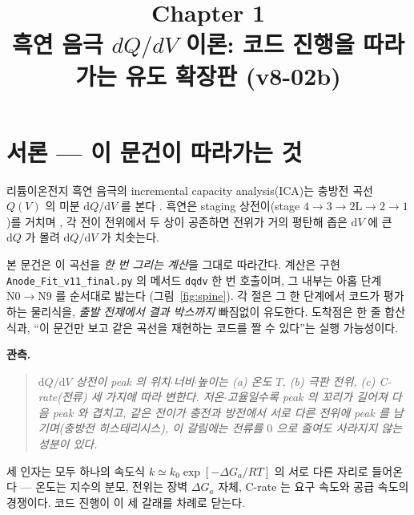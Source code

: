 \documentclass[11pt,a4paper]{article}
\title{\textbf{\LARGE Chapter 1}\\[0.35em]\Large 흑연 음극 $dQ/dV$ 이론: 코드 진행을 따라가는 유도 확장판 (v8-02b)}
\author{}
\date{}
\newcommand{\dd}{\mathrm{d}}
\newcommand{\code}[1]{\texttt{#1}}
\begin{document}
\maketitle

\section*{서론 — 이 문건이 따라가는 것}
리튬이온전지 흑연 음극의 incremental capacity analysis(ICA)는 충방전 곡선 $Q(V)$ 의 미분
$\dd Q/\dd V$ 를 본다 \cite{bloom2005,dubarry2012}. 흑연은 staging 상전이(stage
$4\!\to\!3\!\to\!2\mathrm L\!\to\!2\!\to\!1$)를 거치며 \cite{dahn1991,ohzuku1993}, 각 전이 전위에서
두 상이 공존하면 전위가 거의 평탄해 좁은 $\dd V$ 에 큰 $\dd Q$ 가 몰려 $\dd Q/\dd V$ 가 치솟는다.

본 문건은 이 곡선을 \emph{한 번 그리는 계산}을 그대로 따라간다. 계산은 구현 \code{Anode\_Fit\_v11\_final.py}
의 메서드 \code{dqdv} 한 번 호출이며, 그 내부는 아홉 단계 $\mathrm N0\!\to\!\mathrm N9$ 를 순서대로 밟는다
(그림~\ref{fig:spine}). 각 절은 그 한 단계에서 코드가 평가하는 물리식을, \emph{출발 전제에서 결과 박스까지} 빠짐없이
유도한다. 도착점은 한 줄 합산식과, ``이 문건만 보고 같은 곡선을 재현하는 코드를 짤 수 있다''는 실행 가능성이다.

\textbf{관측.}
\begin{quote}\itshape
$\dd Q/\dd V$ 상전이 peak 의 위치$\cdot$너비$\cdot$높이는 (a) 온도 $T$, (b) 극판 전위, (c) C-rate(전류)
세 가지에 따라 변한다. 저온$\cdot$고율일수록 peak 의 꼬리가 길어져 다음 peak 와 겹치고, 같은 전이가 충전과 방전에서
서로 다른 전위에 peak 를 남기며(충방전 히스테리시스), 이 갈림에는 전류를 $0$ 으로 줄여도 사라지지 않는 성분이 있다.
\end{quote}

세 인자는 모두 하나의 속도식 $k\simeq k_0\exp[-\Delta G_a/RT]$ 의 서로 다른 자리로 들어온다 — 온도는 지수의 분모,
전위는 장벽 $\Delta G_a$ 자체, C-rate 는 요구 속도와 공급 속도의 경쟁이다. 코드 진행이 이 세 갈래를 차례로 닫는다.
\end{document}
